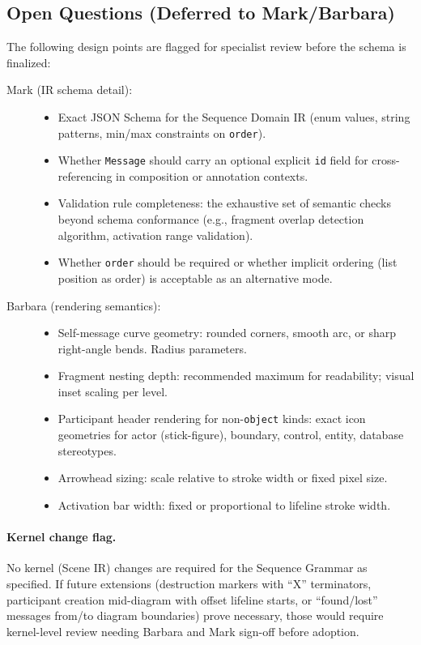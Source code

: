 \subsection{Open Questions (Deferred to Mark/Barbara)}
\label{sec:seq-open-questions}

The following design points are flagged for specialist review before the schema is finalized:

\begin{description}
  \item[Mark (IR schema detail):]
  \begin{itemize}
    \item Exact JSON Schema for the Sequence Domain IR (enum values, string patterns, min/max constraints on \texttt{order}).
    \item Whether \texttt{Message} should carry an optional explicit \texttt{id} field for cross-referencing in composition or annotation contexts.
    \item Validation rule completeness: the exhaustive set of semantic checks beyond schema conformance (e.g., fragment overlap detection algorithm, activation range validation).
    \item Whether \texttt{order} should be required or whether implicit ordering (list position as order) is acceptable as an alternative mode.
  \end{itemize}

  \item[Barbara (rendering semantics):]
  \begin{itemize}
    \item Self-message curve geometry: rounded corners, smooth arc, or sharp right-angle bends. Radius parameters.
    \item Fragment nesting depth: recommended maximum for readability; visual inset scaling per level.
    \item Participant header rendering for non-\texttt{object} kinds: exact icon geometries for actor (stick-figure), boundary, control, entity, database stereotypes.
    \item Arrowhead sizing: scale relative to stroke width or fixed pixel size.
    \item Activation bar width: fixed or proportional to lifeline stroke width.
  \end{itemize}
\end{description}

\paragraph{Kernel change flag.}
No kernel (Scene IR) changes are required for the Sequence Grammar as specified. If future extensions (destruction markers with ``X'' terminators, participant creation mid-diagram with offset lifeline starts, or ``found/lost'' messages from/to diagram boundaries) prove necessary, those would require kernel-level review needing Barbara and Mark sign-off before adoption.
